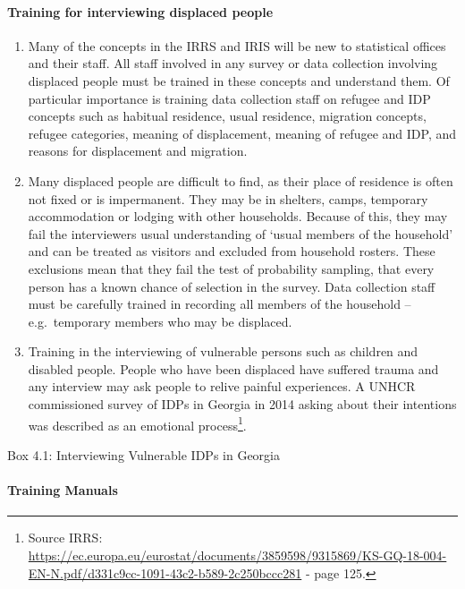 \documentclass[
]{article}
\begin{document}
\hypertarget{training-for-interviewing-displaced-people-1}{%
\paragraph{Training for interviewing displaced people}\label{training-for-interviewing-displaced-people-1}}

\begin{enumerate}
\def\labelenumi{\arabic{enumi}.}
\setcounter{enumi}{338}
\item
  Many of the concepts in the IRRS and IRIS will be new to
  statistical offices and their staff. All staff involved in any
  survey or data collection involving displaced people must be trained
  in these concepts and understand them. Of particular importance is
  training data collection staff on refugee and IDP concepts such as
  habitual residence, usual residence, migration concepts, refugee
  categories, meaning of displacement, meaning of refugee and IDP, and
  reasons for displacement and migration.
\item
  Many displaced people are difficult to find, as their place of
  residence is often not fixed or is impermanent. They may be in
  shelters, camps, temporary accommodation or lodging with other
  households. Because of this, they may fail the interviewers usual
  understanding of `usual members of the household' and can be treated
  as visitors and excluded from household rosters. These exclusions
  mean that they fail the test of probability sampling, that every
  person has a known chance of selection in the survey. Data
  collection staff must be carefully trained in recording all members
  of the household -- e.g.~temporary members who may be displaced.
\item
  Training in the interviewing of vulnerable persons such as children
  and disabled people. People who have been displaced have suffered
  trauma and any interview may ask people to relive painful
  experiences. A UNHCR commissioned survey of IDPs in Georgia in 2014
  asking about their intentions was described as an emotional
  process\footnote{Source IRRS:
    \url{https://ec.europa.eu/eurostat/documents/3859598/9315869/KS-GQ-18-004-EN-N.pdf/d331c9cc-1091-43c2-b589-2c250bccc281}
    - page 125.}.
\end{enumerate}

Box 4.1: Interviewing Vulnerable IDPs in Georgia

\hypertarget{training-manuals-1}{%
\paragraph{Training Manuals}\label{training-manuals-1}}
\end{document}
